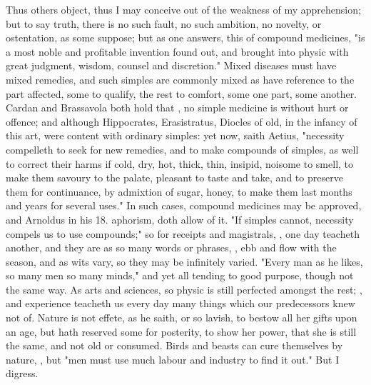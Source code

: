 {Thus others object, thus I may conceive out of the weakness of my apprehension; but to say truth, there is no such fault, no such ambition, no novelty, or ostentation, as some suppose; but as one answers, this of compound medicines, "is a most noble and profitable invention found out, and brought into physic with great judgment, wisdom, counsel and discretion." Mixed diseases must have mixed remedies, and such simples are commonly mixed as have reference to the part affected, some to qualify, the rest to comfort, some one part, some another. Cardan and Brassavola both hold that , no simple medicine is without hurt or offence; and although Hippocrates, Erasistratus, Diocles of old, in the infancy of this art, were content with ordinary simples: yet now, saith Aetius, "necessity compelleth to seek for new remedies, and to make compounds of simples, as well to correct their harms if cold, dry, hot, thick, thin, insipid, noisome to smell, to make them savoury to the palate, pleasant to taste and take, and to preserve them for continuance, by admixtion of sugar, honey, to make them last months and years for several uses." In such cases, compound medicines may be approved, and Arnoldus in his 18. aphorism, doth allow of it. "If simples cannot, necessity compels us to use compounds;" so for receipts and magistrals, , one day teacheth another, and they are as so many words or phrases, , ebb and flow with the season, and as wits vary, so they may be infinitely varied.  "Every man as he likes, so many men so many minds," and yet all tending to good purpose, though not the same way. As arts and sciences, so physic is still perfected amongst the rest; , and experience teacheth us every day many things which our predecessors knew not of. Nature is not effete, as he saith, or so lavish, to bestow all her gifts upon an age, but hath reserved some for posterity, to show her power, that she is still the same, and not old or consumed. Birds and beasts can cure themselves by nature, , but "men must use much labour and industry to find it out." But I digress.

}
